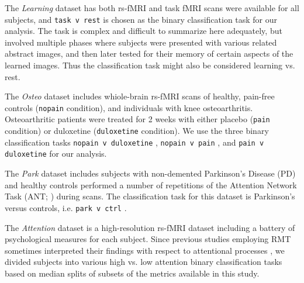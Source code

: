 \documentclass[12pt]{spieman}  %
\newcommand{\code}[1]{\small \texttt{#1} \normalsize}
\begin{document}
\begin{spacing}{2}
The \textit{Learning} dataset\cite{schapiroHumanHippocampalReplay2018,
schapiroHumanHippocampalReplay2020} has both rs-fMRI and task fMRI scans were
available for all subjects, and \code{task v rest} is chosen as the binary
classification task for our analysis.  The task is complex and difficult to
summarize here adequately, but involved multiple phases where subjects were
presented with various related abstract images, and then later tested for their
memory of certain aspects of the learned images. Thus the classification task
might also be considered learning vs. rest.



The \textit{Osteo} dataset\cite{tetreaultBrainConnectivityPredicts2016}
includes whiole-brain rs-fMRI scans of healthy, pain-free controls
(\code{nopain} condition), and individuals with knee osteoarthritis.
Osteoarthritic patients were treated for 2 weeks with either placebo
(\code{pain} condition) or duloxetine (\code{duloxetine} condition).
We use the three binary classification tasks \code{nopain v duloxetine},
\code{nopain v pain}, and \code{pain v duloxetine} for our analysis.



The \textit{Park} dataset\cite{madhyasthaDynamicConnectivityRest2015} includes
subjects with non-demented Parkinson's Disease (PD) and
healthy controls performed a number of repetitions of the Attention Network
Task (ANT; \cite{fanActivationAttentionalNetworks2005}) during scans.
The classification task for this dataset is Parkinson's versus controls, i.e.
\code{park v ctrl}.


The \textit{Attention} dataset\cite{gorgolewskiHighResolution7Tesla2015} is a
high-resolution rs-fMRI dataset including a battery of psychological measures
for each subject. Since previous studies employing RMT sometimes interpreted
their findings with respect to attentional processes
\cite{wangRandomMatrixTheory2016,matharooSpontaneousBackpainAlters2020}, we
divided subjects into various high vs. low attention binary classification
tasks based on median splits of subsets of the metrics available in this study.


\end{spacing}
\end{document}
